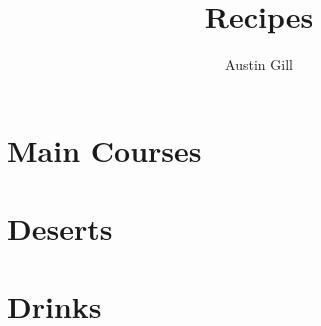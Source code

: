 \documentclass{article}
\title{Recipes}
\author{Austin Gill}
\begin{document}
    \maketitle
    \tableofcontents

    \newpage
    \section{Main Courses}\label{sec:main-courses}
        

    \newpage
    \section{Deserts}\label{sec:deserts}
        

    \newpage
    \section{Drinks}\label{sec:drinks}
        
\end{document}
